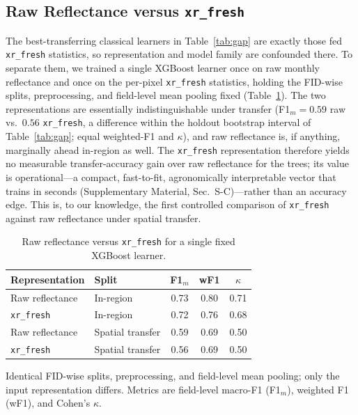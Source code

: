 \documentclass[journal]{IEEEtran}
\begin{document}
\subsection{Raw Reflectance versus \texttt{xr\_fresh}}
\label{sec:repr}
The best-transferring classical learners in Table~\ref{tab:gap} are exactly those fed \texttt{xr\_fresh} statistics, so representation and model family are confounded there. To separate them, we trained a single XGBoost learner once on raw monthly reflectance and once on the per-pixel \texttt{xr\_fresh} statistics, holding the FID-wise splits, preprocessing, and field-level mean pooling fixed (Table~\ref{tab:repr}). The two representations are essentially indistinguishable under transfer (F1$_m=0.59$ raw vs.\ $0.56$ \texttt{xr\_fresh}, a difference within the holdout bootstrap interval of Table~\ref{tab:gap}; equal weighted-F1 and $\kappa$), and raw reflectance is, if anything, marginally ahead in-region as well. The \texttt{xr\_fresh} representation therefore yields no measurable transfer-accuracy gain over raw reflectance for the trees; its value is operational---a compact, fast-to-fit, agronomically interpretable vector that trains in seconds (Supplementary Material, Sec.~S-C)---rather than an accuracy edge. This is, to our knowledge, the first controlled comparison of \texttt{xr\_fresh} against raw reflectance under spatial transfer.

\begin{table}[!t]
\centering
\caption{Raw reflectance versus \texttt{xr\_fresh} for a single fixed XGBoost learner.}
\label{tab:repr}
\renewcommand{\arraystretch}{1.1}
\setlength{\tabcolsep}{6pt}
\footnotesize
\begin{tabular}{llccc}
\toprule
\textbf{Representation} & \textbf{Split} & \textbf{F1$_m$} & \textbf{wF1} & \textbf{$\kappa$} \\
\midrule
Raw reflectance    & In-region        & 0.73 & 0.80 & 0.71 \\
\texttt{xr\_fresh} & In-region        & 0.72 & 0.76 & 0.68 \\
\midrule
Raw reflectance    & Spatial transfer & 0.59 & 0.69 & 0.50 \\
\texttt{xr\_fresh} & Spatial transfer & 0.56 & 0.69 & 0.50 \\
\bottomrule
\end{tabular}
\par\vspace{3pt}
\begin{minipage}{\columnwidth}
\footnotesize
Identical FID-wise splits, preprocessing, and field-level mean pooling; only the input representation differs. Metrics are field-level macro-F1 (F1$_m$), weighted F1 (wF1), and Cohen's $\kappa$.
\end{minipage}
\end{table}
\end{document}
